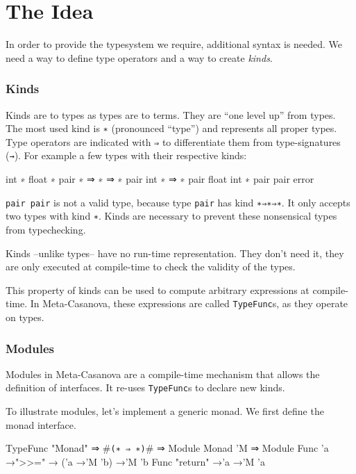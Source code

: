 \section{The Idea}
  In order to provide the typesystem we require, additional syntax is needed.
  We need a way to define type operators and a way to create \textit{kinds}.

  \subsubsection*{Kinds}
  Kinds are to types as types are to terms.\cite[Chapter~30]{Pierce02}
  They are ``one level up'' from types.
  The most used kind is \texttt{∗} (pronounced ``type'') and represents all proper types.
  Type operators are indicated with \texttt{⇒} to differentiate them from type-signatures (\texttt{→}).
  For example a few types with their respective kinds:
  \begin{code}
  int             ∗
  float           ∗
  pair            ∗ ⇒ ∗ ⇒ ∗
  pair int        ∗ ⇒ ∗ 
  pair float int  ∗
  pair pair       error
  \end{code}

  \texttt{pair pair} is not a valid type, because type \texttt{pair} has kind \texttt{∗⇒∗⇒∗}.
  It only accepts two types with kind \texttt{∗}.
  Kinds are necessary to prevent these nonsensical types from typechecking.

  Kinds --unlike types-- have no run-time representation.
  They don't need it, they are only executed at compile-time to check the validity of the types.

  This property of kinds can be used to compute arbitrary expressions at compile-time.
  In Meta-Casanova, these expressions are called \texttt{TypeFunc}s, as they operate on types.

  \subsubsection*{Modules}
  Modules in Meta-Casanova are a compile-time mechanism that allows the definition of interfaces.
  It re-uses \texttt{TypeFunc}s to declare new kinds.

  To illustrate modules, let's implement a generic monad.
  We first define the monad interface.
  
  \begin{code}
  TypeFunc "Monad" ⇒ #\verb|(∗ ⇒ ∗)|# ⇒ Module
  Monad 'M ⇒ Module {
    Func 'a →">>=" → ('a →'M 'b) →'M 'b
    Func "return" →'a →'M 'a
  }
  \end{code}

